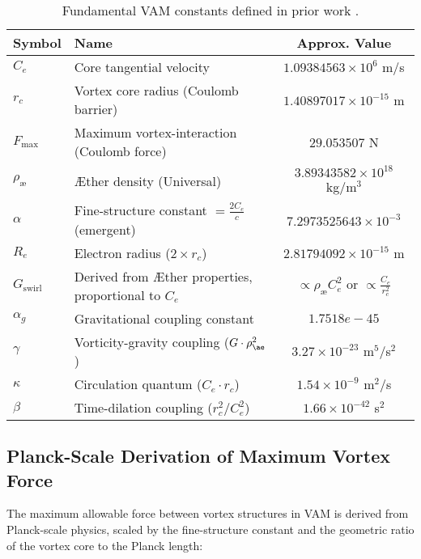 \begin{table}[htbp]
    \centering
    \begin{tabular}{llc}
        \hline
        \textbf{Symbol} & \textbf{Name} & \textbf{Approx. Value} \\
        \hline
        $C_e$ & Core tangential velocity & $1.09384563 \times 10^6$ m/s \\
        $r_c$ & Vortex core radius (Coulomb barrier) & $1.40897017 \times 10^{-15}$ m \\
        $F_{\max}$ & Maximum vortex-interaction (Coulomb force) & $29.053507$ N \\
        $\rho_{\text{\ae}}$ & Æther density (Universal) & $3.89343582 \times 10^{18}$ kg/m$^3$ \\
        $\alpha$ & Fine-structure constant $= \frac{2 C_e}{c}$ (emergent)   & $7.2973525643 \times 10^{-3}$\\
        $R_e$ & Electron radius ($2 \times r_c$) & $2.81794092 \times 10^{-15}$ m \\
        $G_{\text{swirl}}$ & Derived from Æther properties, proportional to $C_e$ & $ \propto \rho_{\text{\ae}} C_e^2$ or $ \propto \frac{C_e}{r_c^2}$  \\
        $\alpha_g$ &   Gravitational coupling constant & $1.7518e-45$ \\
        $\gamma$  & Vorticity-gravity coupling ($G \cdot \rho_{\ae}^2$) & $3.27 \times 10^{-23}$  m$^5$/s$^2$\\
        $\kappa$  & Circulation quantum  ($C_e \cdot r_c$) & $1.54 \times 10^{-9}$  m$^2$/s     \\
        $\beta$  & Time-dilation coupling  ($r_c^2 / C_e^2$) & $1.66 \times 10^{-42}$  s$^2$      \\
        \hline
    \end{tabular}
    \caption{Fundamental VAM constants defined in prior work \cite{vam2025field, vam2025unified}.}\label{tab:table}
\end{table}



\subsection*{Planck-Scale Derivation of Maximum Vortex Force}

The maximum allowable force between vortex structures in VAM is derived from Planck-scale physics, scaled by the fine-structure constant and the geometric ratio of the vortex core to the Planck length:

